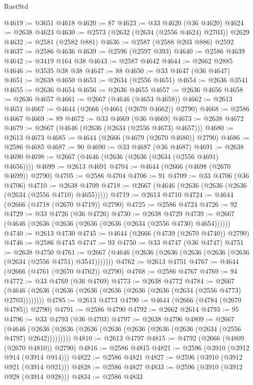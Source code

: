 \begin{lexlean}{RustStd}
\begin{coremodule}
@4619 := @3651 @4618
@4620 := 87
@4623 := @33 @4620 (@36 @4620)
@4624 := @2638 @4623
@4630 := @2573 (@2632 (@2634 (@2556 @4624) @2703)) @2629
@4632 := @2581 (@2582 @881)
@4636 := @2587 (@2588 @203 @886) @2592
@4637 := @2586 @4636
@4639 := @2596 (@2597 @393)
@4640 := @2586 @4639
@4642 := @3419 @164 @38
@4643 := @2587 @4642
@4644 := @2662 @2885
@4646 := @3535 @38 @38
@4647 := 88
@4650 := @33 @4647 (@36 @4647)
@4651 := @2638 @4650
@4653 := @2634 (@2556 @4651)
@4654 := @2636 @3541
@4655 := @2636 @4654
@4656 := @2636 @4655
@4657 := @2636 @4656
@4658 := @2636 @4657
@4661 := @2667 (@4646 (@4653 @4658))
@4662 := @2613 @4651
@4667 := @4644 (@2666 (@4661 (@2670 @4662)) @2790)
@4668 := @2586 @4667
@4669 := 89
@4672 := @33 @4669 (@36 @4669)
@4673 := @2638 @4672
@4679 := @2667 (@4646 (@2636 (@2634 (@2556 @4673) @4657)))
@4680 := @2613 @4673
@4685 := @4644 (@2666 (@4679 (@2670 @4680)) @2790)
@4686 := @2586 @4685
@4687 := 90
@4690 := @33 @4687 (@36 @4687)
@4691 := @2638 @4690
@4698 := @2667 (@4646 (@2636 (@2636 (@2634 (@2556 @4691) @4656))))
@4699 := @2613 @4691
@4704 := @4644 (@2666 (@4698 (@2670 @4699)) @2790)
@4705 := @2586 @4704
@4706 := 91
@4709 := @33 @4706 (@36 @4706)
@4710 := @2638 @4709
@4718 := @2667 (@4646 (@2636 (@2636 (@2636 (@2634 (@2556 @4710) @4655)))))
@4719 := @2613 @4710
@4724 := @4644 (@2666 (@4718 (@2670 @4719)) @2790)
@4725 := @2586 @4724
@4726 := 92
@4729 := @33 @4726 (@36 @4726)
@4730 := @2638 @4729
@4739 := @2667 (@4646 (@2636 (@2636 (@2636 (@2636 (@2634 (@2556 @4730) @4654))))))
@4740 := @2613 @4730
@4745 := @4644 (@2666 (@4739 (@2670 @4740)) @2790)
@4746 := @2586 @4745
@4747 := 93
@4750 := @33 @4747 (@36 @4747)
@4751 := @2638 @4750
@4761 := @2667 (@4646 (@2636 (@2636 (@2636 (@2636 (@2636 (@2634 (@2556 @4751) @3541)))))))
@4762 := @2613 @4751
@4767 := @4644 (@2666 (@4761 (@2670 @4762)) @2790)
@4768 := @2586 @4767
@4769 := 94
@4772 := @33 @4769 (@36 @4769)
@4773 := @2638 @4772
@4784 := @2667 (@4646 (@2636 (@2636 (@2636 (@2636 (@2636 (@2636 (@2634 (@2556 @4773) @2703))))))))
@4785 := @2613 @4773
@4790 := @4644 (@2666 (@4784 (@2670 @4785)) @2790)
@4791 := @2586 @4790
@4792 := @2662 @2614
@4793 := 95
@4796 := @33 @4793 (@36 @4793)
@4797 := @2638 @4796
@4809 := @2667
    (@4646 (@2636 (@2636 (@2636 (@2636 (@2636 (@2636 (@2636 (@2634 (@2556 @4797) @2642)))))))))
@4810 := @2613 @4797
@4815 := @4792 (@2666 (@4809 (@2670 @4810)) @2790)
@4816 := @2586 @4815
@4821 := @2596 (@3910 (@3912 @914 (@3914 @914)))
@4822 := @2586 @4821
@4827 := @2596 (@3910 (@3912 @921 (@3914 @921)))
@4828 := @2586 @4827
@4833 := @2596 (@3910 (@3912 @928 (@3914 @928)))
@4834 := @2586 @4833

\end{coremodule}
\end{lexlean}
